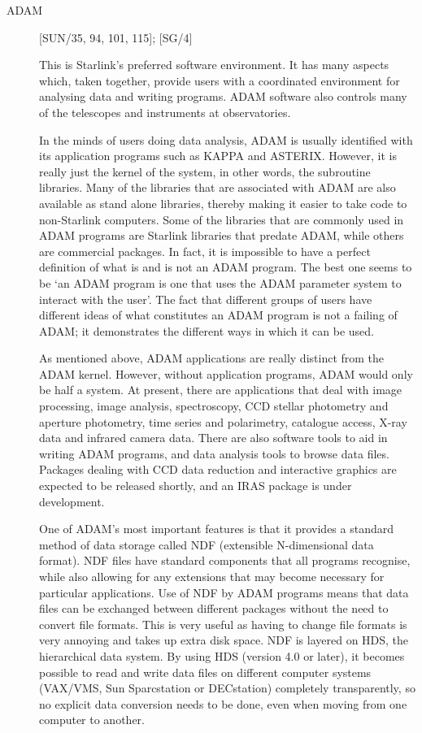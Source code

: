 \begin{description}

\item [ADAM] \hfill [SUN/35, 94, 101, 115]; [SG/4]

This is Starlink's preferred software environment.
It has many aspects which, taken together, provide users with a coordinated
environment for analysing data and writing programs.
ADAM software also controls many of the telescopes and instruments at
observatories.

In the minds of users doing data analysis, ADAM is usually identified with its
application programs such as KAPPA and ASTERIX.
However, it is really just the kernel of the system, in other words, the
subroutine libraries.
Many of the libraries that are associated with ADAM are also available as
stand alone libraries, thereby making it easier to take code to non-Starlink
computers.
Some of the libraries that are commonly used in ADAM programs are Starlink
libraries that predate ADAM, while others are commercial packages.
In fact, it is impossible to have a perfect definition of what is and is not an
ADAM program.
The best one seems to be `an ADAM program is one that uses the ADAM parameter
system to interact with the user'.
The fact that different groups of users have different ideas of what
constitutes an ADAM program is not a failing of ADAM; it demonstrates the
different ways in which it can be used.

As mentioned above, ADAM applications are really distinct from the ADAM kernel.
However, without application programs, ADAM would only be half a system.
At present, there are applications that deal with image processing, image
analysis, spectroscopy, CCD stellar photometry and aperture photometry,
time series and polarimetry, catalogue access, X-ray data and infrared camera
data.
There are also software tools to aid in writing ADAM programs, and data analysis
tools to browse data files.
Packages dealing with CCD data reduction and interactive graphics are expected
to be released shortly, and an IRAS package is under development.

One of ADAM's most important features is that it provides a standard method of
data storage called NDF (extensible N-dimensional data format).
NDF files have standard components that all programs recognise, while also
allowing for any extensions that may become necessary for particular
applications.
Use of NDF by ADAM programs means that data files can be exchanged between
different packages without the need to convert file formats.
This is very useful as having to change file formats is very annoying and takes
up extra disk space. NDF is layered on HDS, the hierarchical data system.
By using HDS (version 4.0 or later), it becomes possible to read and write data
files on different computer systems (VAX/VMS, Sun Sparcstation or DECstation)
completely transparently, so no explicit data conversion needs to be done, even
when moving from one computer to another.


\end{description}
